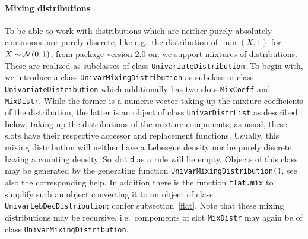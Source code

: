 \documentclass[11pt]{article}
\newcommand{\code}[1]{{\tt #1}}
\begin{document}
\paragraph{Mixing distributions}

To be able to work with distributions which are neither purely absolutely continuous
nor purely discrete, like e.g.\ the distribution of $\min(X,1)$ for 
$X\sim{\cal N}(0,1)$, from package version 2.0 on, we support mixtures of 
distributions. These are realized as subclasses of class \code{UnivariateDistribution}.
To begin with, we introduce a class \code{UnivarMixingDistribution} as subclass of
class \code{UnivariateDistribution} which additionally has two slots \code{MixCoeff}
and \code{MixDistr}. While the former is a numeric vector taking up the mixture
coefficients of the distribution, the latter is an object of class 
\code{UnivarDistrList} as described below, taking up the distributions of the
mixture components; as usual, these slots have their respective accessor and
replacement functions. Usually, this mixing distribution will neither have 
a Lebesgue density nor be purely discrete, having a counting density. So slot
\code{d} as a rule will be empty. Objects of this class may be generated by
the generating function \code{UnivarMixingDistribution()},  see also
the corresponding help. In addition there is the function \code{flat.mix}
to simplify such an object converting it to an object of class 
\code{UnivarLebDecDistribution}; confer subsection~\ref{flat}.
Note that these mixing distributions may be recursive, i.e.\ compoments of 
slot \code{MixDistr} may again
be of class \code{UnivarMixingDistribution}.
\end{document}
